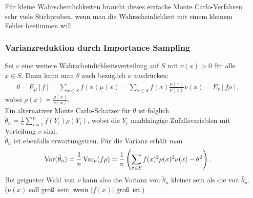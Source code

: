 \begin{bemerkung} F\"ur  kleine Wahrscheinlichkeiten braucht dieses einfache
Monte Carlo-Verfahren sehr viele Stichproben, wenn man die Wahrscheinlichkeit
mit einem kleinem Fehler bestimmen will.
\end{bemerkung}

\subsubsection{Varianzreduktion durch Importance Sampling}
Sei $\nu$ eine weitere Wahrscheinlichkeitsverteilung auf $S$ mit $\nu(x) > 0$
f\"ur alle $x \in S$. Dann kann man $\theta$ auch bez\"uglich $\nu$
ausdr\"ucken:
\begin{eqnarray}
\theta = E_\mu[f] = \sum_{x\in S} f(x) \mu(x) = \sum_{x\in S} f(x)
\frac{\mu(x)}{\nu(x)} \nu(x) = E_\nu[f \rho], \nonumber
\end{eqnarray}
wobei $\rho(x) = \frac{\mu(x)}{\nu(x)}$. \\

Ein alternativer Monte Carlo-Sch\"atzer f\"ur $\theta$ ist folglich
$\widetilde{\theta}_n = \frac{1}{n} \sum_{i=1}^n f(Y_i) \rho(Y_i)$, wobei die
$Y_i$ unabh\"angige Zufallsvariablen mit Verteilung $\nu$ sind. \\

$\widetilde{\theta}_n$ ist ebenfalls erwartungstreu. F\"ur die Varianz
erh\"alt man
\begin{eqnarray}
\operatorname{Var}(\widetilde{\theta}_n) = \frac{1}{n} \operatorname{Var}_\nu(f \rho) = \frac{1}{n} \left(
\sum_{x \in S} f(x)^2 \rho(x)^2\nu(x) - \theta^2 \right). \nonumber
\end{eqnarray}
Bei geigneter Wahl von $\nu$ kann also die Varianz von $\widetilde{\theta}_n$
kleiner sein als die von $\widehat{\theta}_n$. ($\nu (x)$ soll gro\ss\ sein,
wenn $|f(x)|$ gro\ss\ ist.)
